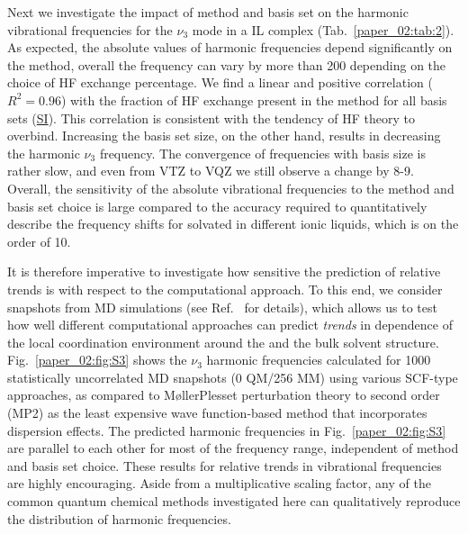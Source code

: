 \documentclass[%
  class = book,%
  crop = false,%
  float = true,%
  multi = true,%
  preview = false,%
]{standalone}
\let\cite\autocite
\newcommand{\cotil}{\ce{CO2}\textendash{}IL\xspace}%
\begin{document}
Next we investigate the impact of method and basis set on the harmonic vibrational frequencies for the \(\nu_{3}\) mode in a \cotil complex (Tab.~\ref{paper_02:tab:2}). As expected, the absolute values of harmonic frequencies depend significantly on the method, overall the frequency can vary by more than \SI{200}{\wavenumber} depending on the choice of HF exchange percentage. We find a linear and positive correlation (\(R^{2} = 0.96\)) with the fraction of HF exchange present in the method for all basis sets (\hyperref[paper_02:sec:SI]{SI}). This correlation is consistent with the tendency of HF theory to overbind. Increasing the basis set size, on the other hand, results in decreasing the harmonic  \(\nu_{3}\) frequency. The convergence of frequencies with basis size is rather slow, and even from VTZ to VQZ we still observe a change by \num{8}-\SI{9}{\wavenumber}. Overall, the sensitivity of the absolute vibrational frequencies to the method and basis set choice is large compared to the accuracy required to quantitatively describe the frequency shifts for  solvated in different ionic liquids, which is on the order of \SI{10}{\wavenumber}.

It is therefore imperative to investigate how sensitive the prediction of relative trends is with respect to the computational approach. To this end, we consider snapshots from MD simulations (see Ref.~\parencite{Daly2016} for details), which allows us to test how well different computational approaches can predict \emph{trends} in dependence of the local coordination environment around the  and the bulk solvent structure. Fig.~\ref{paper_02:fig:S3} shows the  \(\nu_{3}\) harmonic frequencies calculated for \num{1000} statistically uncorrelated MD snapshots (0 QM/256 MM) using various SCF-type approaches, as compared to M\o{}ller\textendash{}Plesset perturbation theory to second order (MP2) as the least expensive wave function-based method that incorporates dispersion effects.\cite{WCMS:WCMS58} The predicted harmonic frequencies in Fig.~\ref{paper_02:fig:S3} are parallel to each other for most of the frequency range, independent of method and basis set choice. These results for relative trends in vibrational frequencies are highly encouraging. Aside from a multiplicative scaling factor, any of the common quantum chemical methods investigated here can qualitatively reproduce the distribution of harmonic frequencies.
\end{document}
